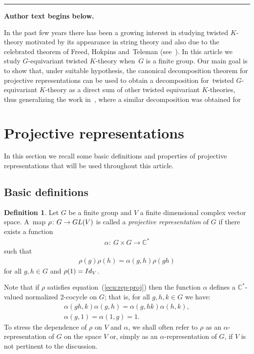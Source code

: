 \documentclass[11pt]{article}
\numberwithin{equation}{section}
\def\C{\mathbb{C}}
\theoremstyle{definition}
\newtheorem{Def}[Th]{Definition}
\numberwithin{equation}{section}
\begin{document}
\medskip\hrule\medskip\noindent\textbf{Author text begins below.}\par
\setcounter{section}{1}
In the past few years there has been a growing interest in studying
twisted $K$-theory motivated by its appearance in string theory and also due
to the celebrated theorem of Freed, Hokpins and~Teleman (see~\cite[Theorem~1]{FHT}).
In this article we study $G$-equivariant twisted $K$-theory when~$G$ is a finite group.
Our main goal is to show that, under suitable hypothesis, the canonical decomposition
theorem for projective representations can be used to obtain a decomposition for~twisted
$G$-equivariant $K$-theory as a direct sum of other twisted equivariant $K$-theories,
thus generalizing the work in~\cite{GomezUribe}, where a similar decomposition was obtained for

\setcounter{section}{1}
\section{Projective representations}\label{Section 2}

In this section we recall some basic definitions and properties of projective representations that
will be used throughout this article.

\subsection{Basic definitions}

\begin{Def}
Let $G$ be a finite group and $V$ a finite dimensional complex
vector space. A~map $\rho\colon G\rightarrow {\rm GL}(V)$ is called a
\textit{projective representation} of $G$ if there exists a
function
\begin{gather*}
\alpha\colon \ G\times G \rightarrow \C^{\ast}
\end{gather*}
such that
\begin{gather}
\rho(g)\rho(h)=\alpha(g,h)\rho(gh)\label{ecu:rep-proj}
\end{gather}
for all $g,h\in G$ and $\rho(1)={\rm Id}_{V}$.
\end{Def}
	
Note that if $\rho$ satisfies equation~(\ref{ecu:rep-proj}) then the function $\alpha$ defines a
$\C^{\ast}$-valued normalized 2-cocycle on $G$; that is, for all $g,h,k\in G$ we have:
\begin{gather*}
\alpha(gh,k)\alpha(g,h)=\alpha(g,hk)\alpha(h,k),
\\
\alpha(g,1)=\alpha(1,g)=1.
\end{gather*}
To stress the dependence of $\rho$ on $V$ and $\alpha$, we shall
often refer to $\rho$ as an $\alpha$-representation of $G$
on the space $V$ or, simply as an $\alpha$-representation of
$G$, if $V$ is not pertinent to the discussion.
\end{document}
